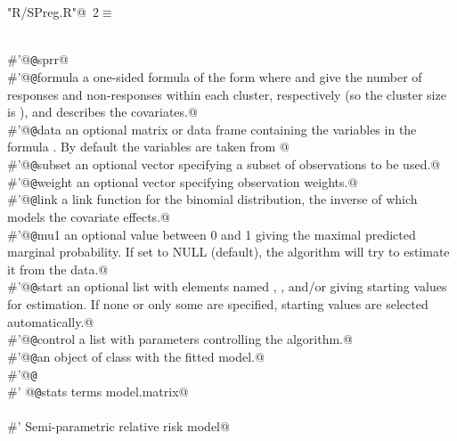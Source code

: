 \documentclass[reqno]{amsart}
\renewcommand{\NWtarget}[2]{\hypertarget{#1}{#2}}
\begin{document}
\begin{flushleft} \small\label{scrap3}\raggedright\small
\NWtarget{nuweb2}{} \verb@"R/SPreg.R"@\nobreak\ {\footnotesize {2}}$\equiv$
\vspace{-1ex}
\begin{list}{}{} \item
\mbox{}\verb@@\\
\mbox{}\verb@#'@{\tt @}\verb@rdname sprr@\\
\mbox{}\verb@#'@{\tt @}\verb@param formula a one-sided formula of the form  where  and  give the number of responses and non-responses within each cluster, respectively (so the cluster size is ), and  describes the covariates.@\\
\mbox{}\verb@#'@{\tt @}\verb@param data  an optional matrix or data frame containing the variables in the formula . By default the variables are taken from @\\
\mbox{}\verb@#'@{\tt @}\verb@param subset  an optional vector specifying a subset of observations to be used.@\\
\mbox{}\verb@#'@{\tt @}\verb@param weight  an optional vector specifying observation weights.@\\
\mbox{}\verb@#'@{\tt @}\verb@param link      a link function for the binomial distribution, the inverse of which models the covariate effects.@\\
\mbox{}\verb@#'@{\tt @}\verb@param mu1       an optional value between 0 and 1 giving the maximal predicted marginal probability. If set to NULL (default), the algorithm will try to estimate it from the data.@\\
\mbox{}\verb@#'@{\tt @}\verb@param start     an optional list with elements named , , and/or  giving starting values for estimation. If none or only some are specified, starting values are selected automatically.@\\
\mbox{}\verb@#'@{\tt @}\verb@param control a list with parameters controlling the algorithm.@\\
\mbox{}\verb@#'@{\tt @}\verb@return an object of class  with the fitted model.@\\
\mbox{}\verb@#'@{\tt @}\verb@export@\\
\mbox{}\verb@#' @{\tt @}\verb@importFrom stats terms model.matrix@\\
\mbox{}\verb@@\\
\mbox{}\verb@#' Semi-parametric relative risk model@\\

\end{list}
\end{flushleft}
\end{document}
